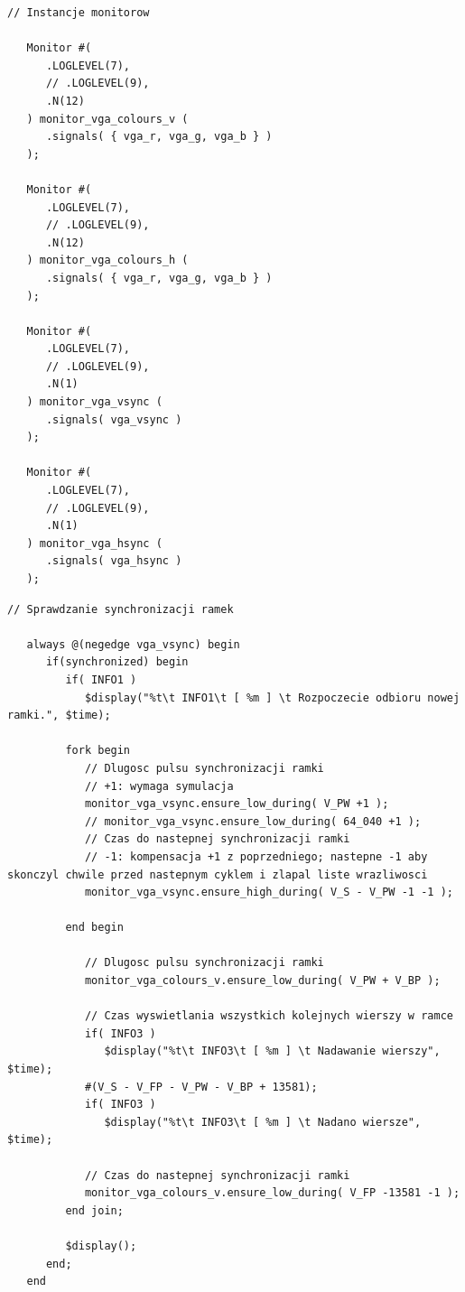 \documentclass[a4paper,12pt]{article}
\begin{document}
\begin{lstlisting}[label=Syncvga,caption=Sync.v,firstnumber=56]
   // Instancje monitorow

   Monitor #(
      .LOGLEVEL(7),
      // .LOGLEVEL(9),
      .N(12)
   ) monitor_vga_colours_v (
      .signals( { vga_r, vga_g, vga_b } )
   );

   Monitor #(
      .LOGLEVEL(7),
      // .LOGLEVEL(9),
      .N(12)
   ) monitor_vga_colours_h (
      .signals( { vga_r, vga_g, vga_b } )
   );

   Monitor #(
      .LOGLEVEL(7),
      // .LOGLEVEL(9),
      .N(1)
   ) monitor_vga_vsync (
      .signals( vga_vsync )
   );

   Monitor #(
      .LOGLEVEL(7),
      // .LOGLEVEL(9),
      .N(1)
   ) monitor_vga_hsync (
      .signals( vga_hsync )
   );
\end{lstlisting}


\begin{lstlisting}[label=Syncvga,caption=Sync.v,firstnumber=56]
   // Sprawdzanie synchronizacji ramek

   always @(negedge vga_vsync) begin
      if(synchronized) begin
         if( INFO1 )
            $display("%t\t INFO1\t [ %m ] \t Rozpoczecie odbioru nowej ramki.", $time);

         fork begin
            // Dlugosc pulsu synchronizacji ramki
            // +1: wymaga symulacja
            monitor_vga_vsync.ensure_low_during( V_PW +1 );
            // monitor_vga_vsync.ensure_low_during( 64_040 +1 );
            // Czas do nastepnej synchronizacji ramki
            // -1: kompensacja +1 z poprzedniego; nastepne -1 aby skonczyl chwile przed nastepnym cyklem i zlapal liste wrazliwosci
            monitor_vga_vsync.ensure_high_during( V_S - V_PW -1 -1 );

         end begin

            // Dlugosc pulsu synchronizacji ramki
            monitor_vga_colours_v.ensure_low_during( V_PW + V_BP );

            // Czas wyswietlania wszystkich kolejnych wierszy w ramce
            if( INFO3 )
               $display("%t\t INFO3\t [ %m ] \t Nadawanie wierszy", $time);
            #(V_S - V_FP - V_PW - V_BP + 13581);
            if( INFO3 )
               $display("%t\t INFO3\t [ %m ] \t Nadano wiersze", $time);

            // Czas do nastepnej synchronizacji ramki
            monitor_vga_colours_v.ensure_low_during( V_FP -13581 -1 );
         end join;

         $display();
      end;
   end
\end{lstlisting}
\end{document}
